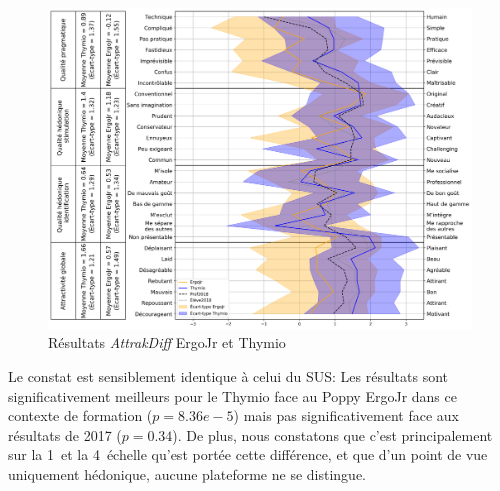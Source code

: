                 \begin{figure}[!h]
                    \centering
                    \label{fig:att_vs_thymio}\includegraphics[width=0.9\linewidth]{Figures/Desprez_eiah-atrakdiff.png}
                    \caption{Résultats \textit{AttrakDiff} ErgoJr et Thymio~}
                \end{figure}\par%
                Le constat est sensiblement identique à celui du SUS: Les résultats sont significativement meilleurs pour le Thymio face au Poppy ErgoJr dans ce contexte de formation ($p=8.36e-5$) mais pas significativement face aux résultats de 2017 ($p=0.34$).
                De plus, nous constatons que c'est principalement sur la 1\iere~et la 4\ieme~échelle qu'est portée cette différence,  et que d'un point de vue uniquement hédonique, aucune plateforme ne se distingue.
